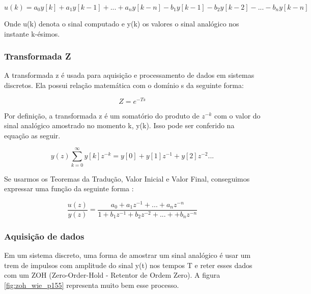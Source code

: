 \begin{equation}
  u(k) = a_{0}y[k]+a_{1}y[k-1]+...+a_{n}y[k-n] - b_{1}y[k-1] - b_{2}y[k-2] - ... -b_{n}y[k-n]
\end{equation}

Onde u(k) denota o sinal computado e y(k) os valores o sinal analógico nos instante k-ésimos.


\subsubsection{Transformada Z}

A transformada z é usada para aquisição e processamento de dados em sistemas discretos. Ela possui relação matemática com o domínio s da seguinte forma:

\begin{equation}
Z = e^{-Ts}
\end{equation}

Por definição, a transformada z é um somatório do produto de $z^{-k}$ com o valor do sinal analógico amostrado no momento k, y(k). Isso pode ser conferido na equação as seguir.

\begin{equation}
  y(z) \sum_{k=0}^{\infty}{y[k]z^{-k}} = y[0] + y[1]z^{-1}+y[2]z^{-2}...
 \end{equation} 

 Se usarmos os Teoremas da Tradução, Valor Inicial e Valor Final, conseguimos expressar uma função da seguinte forma \cite{BongWie2001}:

\begin{equation}
  \frac{u(z)}{y(z)} = \frac{a_0 + a_1z^{-1}+...+a_nz^{-n}}{1+b_1z^{-1}+b_2z^{-2}+...++b_nz^{-n}}
\end{equation}


\subsubsection{Aquisição de dados}

Em um sistema discreto, uma forma de amostrar um sinal analógico é usar um trem de impulsos com amplitude do sinal y(t) nos tempos T e reter esses dados com um ZOH (Zero-Order-Hold - Retentor de Ordem Zero). A figura \ref{fig:zoh_wie_p155} representa muito bem esse processo.


